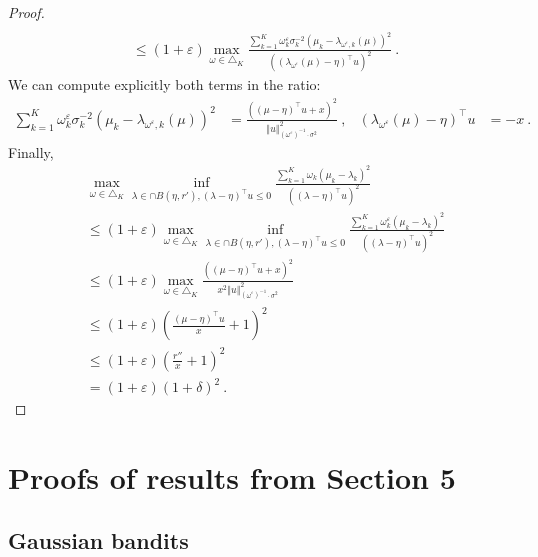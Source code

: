 \documentclass{article}
\begin{document}
\begin{proof}
\begin{align*}
\\
&\le (1 + \varepsilon) \max_{\omega \in \triangle_K} 
  \frac{\sum_{k=1}^K \omega_{k}^\varepsilon \sigma_k^{-2} (\mu_k - \lambda_{\omega^\varepsilon,k}(\mu))^2}{((\lambda_{\omega^\varepsilon}(\mu) - \eta)^\top u)^2}
\: .
\end{align*}
We can compute explicitly both terms in the ratio:
\begin{align*}
\sum_{k=1}^K \omega_{k}^\varepsilon \sigma_k^{-2} (\mu_k - \lambda_{\omega^\varepsilon,k}(\mu))^2
&= \frac{((\mu - \eta)^\top u + x)^2}{\Vert u \Vert^2_{(\omega^\varepsilon)^{-1} \cdot \sigma^{2}}}
\: ,
&
(\lambda_{\omega^\varepsilon}(\mu) - \eta)^\top u
&= -x
\: .
\end{align*}
Finally,
\begin{align*}
&\max_{\omega \in \triangle_K} \inf_{\lambda \in \cap B(\eta, r'), (\lambda - \eta)^\top u \le 0}
  \frac{\sum_{k=1}^K \omega_{k} (\mu_k - \lambda_k)^2}{((\lambda - \eta)^\top u)^2}
\\
&\le (1 + \varepsilon) \max_{\omega \in \triangle_K} \inf_{\lambda \in \cap B(\eta, r'), (\lambda - \eta)^\top u \le 0}
  \frac{\sum_{k=1}^K \omega_{k}^\varepsilon (\mu_k - \lambda_k)^2}{((\lambda - \eta)^\top u)^2}
\\
&\le (1 + \varepsilon) \max_{\omega \in \triangle_K}
  \frac{((\mu - \eta)^\top u + x)^2}{x^2 \Vert u \Vert^2_{(\omega^\varepsilon)^{-1} \cdot \sigma^{2}}}
\\
&\le (1 + \varepsilon) (\frac{(\mu - \eta)^\top u}{x} + 1)^2
\\
&\le (1 + \varepsilon) (\frac{r''}{x} + 1)^2
\\
&= (1 + \varepsilon) (1 + \delta)^2
\: .
\end{align*}
\end{proof}


\section{Proofs of results from Section 5}
\label{sec:proofs_relative_to_section_sec:no_complexity_in_best_arm_identification}

\subsection{Gaussian bandits}
\label{sub:gaussian_bai_proof}
\end{document}
